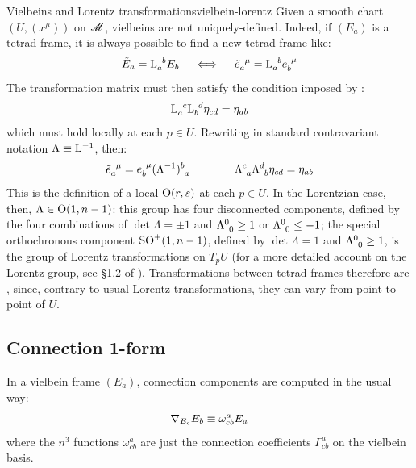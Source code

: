 \begin{observation}{Vielbeins and Lorentz transformations}{vielbein-lorentz}
  Given a smooth chart $ (U,(x^\mu)) $ on $ \mathscr{M} $, vielbeins are not uniquely-defined. Indeed, if $ (E_a) $ is a tetrad frame, it is always possible to find a new tetrad frame like:
  \begin{equation*}
    \tilde{E}_a = \tensor{\mt{L}}{_a^b} E_b
    \quad \iff \quad
    \tensor{\tilde{e}}{_a^\mu} = \tensor{\mt{L}}{_a^b} \tensor{e}{_b^\mu}
  \end{equation*}
  The transformation matrix must then satisfy the condition imposed by :
  \begin{equation*}
    \tensor{\mt{L}}{_a^c} \tensor{\mt{L}}{_b^d} \eta_{cd} = \eta_{ab}
  \end{equation*}
  which must hold locally at each $ p \in U $. Rewriting in standard contravariant notation $ \Lambda \equiv \mathrm{L}^{-1} $, then:
  \begin{equation}
    \tensor{\tilde{e}}{_a^\mu} = \tensor{e}{_b^\mu} \tensor{(\Lambda^{-1})}{^b_a}
    \qquad \qquad
    \tensor{\Lambda}{^c_a} \tensor{\Lambda}{^d_b} \eta_{cd} = \eta_{ab}
    \label{eq:vielbeins-trans}
  \end{equation}
  This is the definition of a local $ \mathrm{O}(r,s) $ at each $ p \in U $.
  In the Lorentzian case, then, $ \Lambda \in \mathrm{O}(1,n-1) $: this group has four disconnected components, defined by the four combinations of $ \det \Lambda = \pm 1 $ and $ \tensor{\Lambda}{^0_0} \geq 1 $ or $ \tensor{\Lambda}{^0_0} \leq -1 $; the special orthochronous component $ \mathrm{SO}^+(1,n-1) $, defined by $ \det \Lambda = 1 $ and $ \tensor{\Lambda}{^0_0} \geq 1 $, is the group of Lorentz transformations on $ T_pU $ (for a more detailed account on the Lorentz group, see \S 1.2 of \cite{leonardo}).
  Transformations between tetrad frames therefore are , since, contrary to usual Lorentz transformations, they can vary from point to point of $ U $.
\end{observation}

\subsection{Connection 1-form}

In a vielbein frame $ (E_a) $, connection components are computed in the usual way:
\begin{equation}
  \nabla_{E_c} E_b \equiv \omega^a_{cb} E_a
  \label{eq:connection-vielbeins}
\end{equation}
where the $ n^3 $ functions $ \omega^a_{cb} $ are just the connection coefficients $ \Gamma^a_{cb} $ on the vielbein basis.


